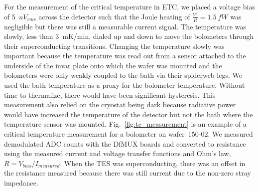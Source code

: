 
%
%
%
%

For the measurement of the critical temperature in \ac{ETC}, we placed a voltage bias of 5~$nV_{rms}$ across the detector such that the Joule heating of $\frac{V^2}{R} = 1.5~fW$ was negligible but there was still a measurable current signal. 
The temperature was slowly, less than 3~mK/min, dialed up and down to move the bolometers through their superconducting transitions. 
Changing the temperature slowly was important because the temperature was read out from a sensor attached to the underside of the invar plate onto which the wafer was mounted 
and the bolometers were only weakly coupled to the bath via their spiderweb legs. 
We used the bath temperature as a proxy for the bolometer temperature. 
Without time to thermalize, there would have been significant hysteresis. 
This measurement also relied on the cryostat being dark because radiative power would have increased the temperature of the detector but not the bath where the temperature sensor was mounted. 
Fig.~\ref{fig:tc_measurement} is an example of a critical temperature measurement for a bolometer on wafer~150-02. 
We measured demodulated \ac{ADC} counts with the \ac{DfMUX} boards and converted to resistance using the measured current and voltage transfer functions and Ohm's law, $R=V_{bias}/I_{measured}$.
When the \ac{TES} was superconducting, there was an offset in the resistance measured because there was still current due to the non-zero stray impedance. 


